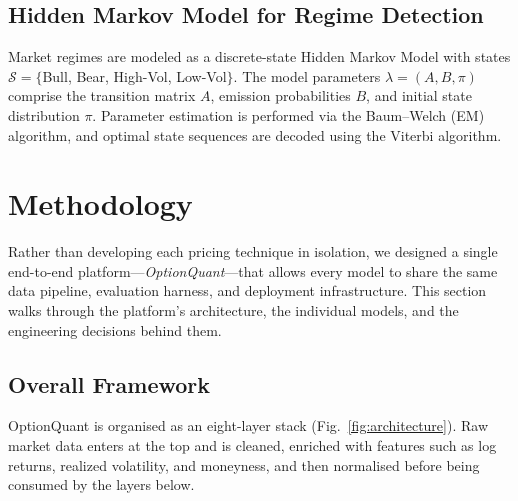\documentclass[conference]{IEEEtran}
\begin{document}
\subsection{Hidden Markov Model for Regime Detection}

Market regimes are modeled as a discrete-state Hidden Markov Model with states $\mathcal{S} = \{$Bull, Bear, High-Vol, Low-Vol$\}$. The model parameters $\lambda = (A, B, \pi)$ comprise the transition matrix $A$, emission probabilities $B$, and initial state distribution $\pi$. Parameter estimation is performed via the Baum--Welch (EM) algorithm, and optimal state sequences are decoded using the Viterbi algorithm.



\section{Methodology}\label{sec:methodology}

Rather than developing each pricing technique in isolation, we designed a single end-to-end platform---\textit{OptionQuant}---that allows every model to share the same data pipeline, evaluation harness, and deployment infrastructure. This section walks through the platform's architecture, the individual models, and the engineering decisions behind them.

\subsection{Overall Framework}

OptionQuant is organised as an eight-layer stack (Fig.~\ref{fig:architecture}). Raw market data enters at the top and is cleaned, enriched with features such as log returns, realized volatility, and moneyness, and then normalised before being consumed by the layers below.
\end{document}
